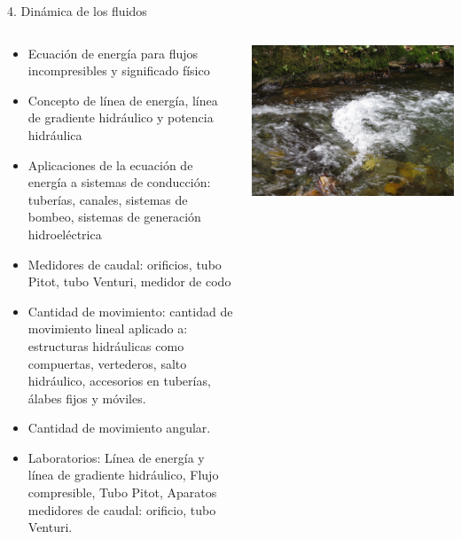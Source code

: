 \documentclass [xcolor=svgnames, t] {beamer}
\begin{document}
\begin{frame}{4. Din\'amica de los fluidos}
\vspace{-1.2cm}
\begin{columns}
\begin{exampleblock}{}
\begin{itemize}
\footnotesize
\item Ecuación de energía para flujos incompresibles y significado físico
\item Concepto de línea de energía, línea de gradiente hidráulico y potencia hidráulica
\item Aplicaciones de la ecuación de energía a sistemas de conducción: tuberías, canales, sistemas de bombeo, sistemas de generación hidroeléctrica
\item Medidores de caudal: orificios, tubo Pitot, tubo Venturi, medidor de codo
\item Cantidad de movimiento: cantidad de movimiento lineal aplicado a: estructuras hidráulicas como compuertas, vertederos, salto hidráulico, accesorios en tuberías, álabes fijos y móviles. 
\item Cantidad de movimiento angular.
\scriptsize
\item \alert{Laboratorios: Línea de energía y línea de gradiente hidráulico, Flujo compresible, Tubo Pitot, Aparatos medidores de caudal: orificio, tubo Venturi.}
\end{itemize}
\end{exampleblock}
\begin{center}
\includegraphics[width=\textwidth]{fmd}

\end{center}
\end{columns}
\end{frame}
\end{document}
